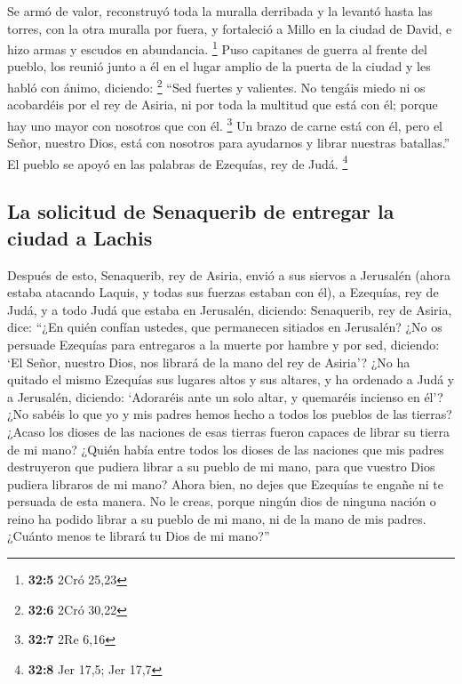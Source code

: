  Se armó de valor, reconstruyó toda la muralla derribada y
la levantó hasta las torres, con la otra muralla por fuera, y fortaleció
a Millo en la ciudad de David, e hizo armas y escudos en abundancia.
\footnote{\textbf{32:5} 2Cró 25,23}  Puso capitanes de
guerra al frente del pueblo, los reunió junto a él en el lugar amplio de
la puerta de la ciudad y les habló con ánimo, diciendo: \footnote{\textbf{32:6}
  2Cró 30,22}  ``Sed fuertes y valientes. No tengáis miedo
ni os acobardéis por el rey de Asiria, ni por toda la multitud que está
con él; porque hay uno mayor con nosotros que con él. \footnote{\textbf{32:7}
  2Re 6,16}  Un brazo de carne está con él, pero el Señor,
nuestro Dios, está con nosotros para ayudarnos y librar nuestras
batallas.'' El pueblo se apoyó en las palabras de Ezequías, rey de Judá.
\footnote{\textbf{32:8} Jer 17,5; Jer 17,7}

\hypertarget{la-solicitud-de-senaquerib-de-entregar-la-ciudad-a-lachis}{%
\subsection{La solicitud de Senaquerib de entregar la ciudad a
Lachis}\label{la-solicitud-de-senaquerib-de-entregar-la-ciudad-a-lachis}}

 Después de esto, Senaquerib, rey de Asiria, envió a sus
siervos a Jerusalén (ahora estaba atacando Laquis, y todas sus fuerzas
estaban con él), a Ezequías, rey de Judá, y a todo Judá que estaba en
Jerusalén, diciendo:  Senaquerib, rey de Asiria, dice:
``¿En quién confían ustedes, que permanecen sitiados en Jerusalén?
 ¿No os persuade Ezequías para entregaros a la muerte por
hambre y por sed, diciendo: `El Señor, nuestro Dios, nos librará de la
mano del rey de Asiria'?  ¿No ha quitado el mismo
Ezequías sus lugares altos y sus altares, y ha ordenado a Judá y a
Jerusalén, diciendo: `Adoraréis ante un solo altar, y quemaréis incienso
en él'?  ¿No sabéis lo que yo y mis padres hemos hecho a
todos los pueblos de las tierras? ¿Acaso los dioses de las naciones de
esas tierras fueron capaces de librar su tierra de mi mano?
 ¿Quién había entre todos los dioses de las naciones que
mis padres destruyeron que pudiera librar a su pueblo de mi mano, para
que vuestro Dios pudiera libraros de mi mano?  Ahora
bien, no dejes que Ezequías te engañe ni te persuada de esta manera. No
le creas, porque ningún dios de ninguna nación o reino ha podido librar
a su pueblo de mi mano, ni de la mano de mis padres. ¿Cuánto menos te
librará tu Dios de mi mano?''

